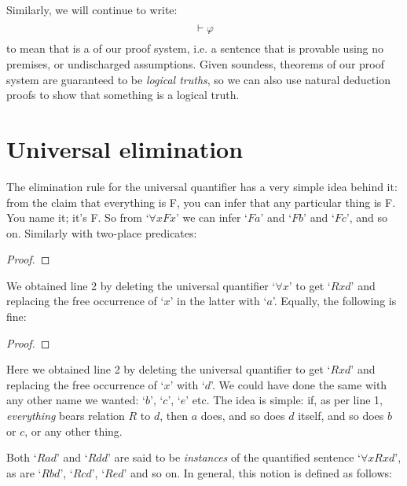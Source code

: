 Similarly, we will continue to write:
$${} \vdash \mathcal{\varphi}$$
to mean that \meta{\varphi} is a  of our proof system, i.e. a sentence that is provable using no premises, or undischarged assumptions.  Given soundess, theorems of our proof system are guaranteed to be \emph{logical truths}, so we can also use natural deduction proofs to show that something is a logical truth.



\section{Universal elimination}\label{s:UniversalElim}


The elimination rule for the universal quantifier has a very simple idea behind it: from the claim that everything is F, you can infer that any particular thing is F. You name it; it's F.  So from `$\forall xFx$' we can infer `$Fa$' and `$Fb$' and `$Fc$', and so on.  Similarly with two-place predicates:
\begin{proof}
	 
\end{proof}
We obtained line 2 by deleting the universal quantifier `$\forall x$' to get `$Rxd$' and replacing the free occurrence of `$x$' in the latter with `$a$'. Equally, the following is fine:
\begin{proof}
	 
\end{proof}
Here we obtained line 2 by deleting the universal quantifier to get `$Rxd$' and replacing the free occurrence of `$x$' with `$d$'. We could have done the same with any other name we wanted: `$b$', `$c$', `$e$' etc.  The idea is simple: if, as per line 1, \emph{everything} bears relation $R$ to $d$, then $a$ does, and so does $d$ itself, and so does $b$ or $c$, or any other thing.

Both `$Rad$' and `$Rdd$' are said to be \emph{instances} of the quantified sentence `$\forall xRxd$', as are `$Rbd$', `$Rcd$', `$Red$' and so on.  In general, this notion is defined as follows:




